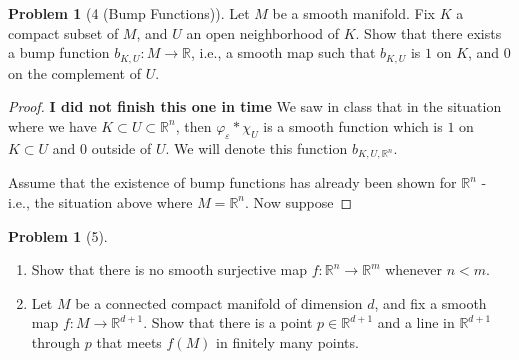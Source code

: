 \documentclass[reqno]{amsart}
\theoremstyle{definition}
\newtheorem{problem}[theorem]{Problem}
\theoremstyle{remark}
\begin{document}
    \begin{problem}[4 (Bump Functions)]
        Let $M$ be a smooth manifold. Fix $K$ a compact
        subset of $M$, and $U$ an open neighborhood
        of $K$. Show that there exists a bump
        function $b_{K, U} \colon M \to \mathbb{R}$, i.e.,
        a smooth map such that $b_{K,U}$ is
        $1$ on $K$, and $0$ on the complement of
        $U$.
    \end{problem}

    \begin{proof}
        \textbf{I did not finish this one in time}
        We saw in class that in the situation where
        we have
        $K \subset U \subset \mathbb{R}^{n}$, then
        $\varphi_{\varepsilon} * \chi_U$ is a smooth
        function which is
        $1$ on $K \subset U$ and
        $0$ outside of $U$. We will denote
        this function
        $b_{K, U, \mathbb{R}^{n}}$.
        

        Assume that the existence of bump functions has
        already been shown for $\mathbb{R}^{n}$ - i.e., the
        situation above where $M = \mathbb{R}^{n}$.
        Now suppose

    \end{proof}



    \begin{problem}[5]
        \begin{enumerate}
            \item Show that there is no smooth surjective map
                $f \colon \mathbb{R}^{n} \to 
                \mathbb{R}^{m}$ whenever
                $n < m$.
            \item Let $M$ be a connected compact manifold
                of dimension $d$, and fix a smooth
                map $f \colon M \to \mathbb{R}^{d+1}$.
                Show that there is a point
                $p \in \mathbb{R}^{d+1}$ and a
                line in $\mathbb{R}^{d+1}$ through
                $p$ that meets $f(M)$ in finitely
                many points.
        \end{enumerate}
    \end{problem}
\end{document}
